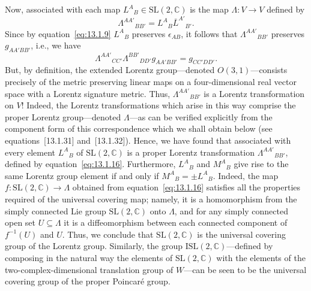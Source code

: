 Now, associated with each map \(L^A{}_B\in\mathrm{SL}(2,\mathbb C)\) is the map
\(\Lambda:V\longrightarrow V\) defined by
\begin{equation}
  \Lambda^{AA'}{}_{BB'}=L^A{}_B\overline L^{A'}{}_{B'}.
  \tag{13.1.16}\label{eq:13.1.16}
\end{equation}
Since by equation~\eqref{eq:13.1.9} \(L^A{}_B\) preserves
\(\epsilon_{AB}\), it follows that \(\Lambda^{AA'}{}_{BB'}\) preserves
\(g_{AA'BB'}\), i.e., we have
\begin{equation}
  \Lambda^{AA'}{}_{CC'}\Lambda^{BB'}{}_{DD'}g_{AA'BB'}
  =g_{CC'DD'}.
  \tag{13.1.17}\label{eq:13.1.17}
\end{equation}
But, by definition, the extended Lorentz group---denoted \(O(3,1)\)---consists
precisely of the metric preserving linear maps on a four-dimensional real vector
space with a Lorentz signature metric. Thus, \(\Lambda^{AA'}{}_{BB'}\) is a Lorentz
transformation on \(V\)! Indeed, the Lorentz transformations which arise in this way
comprise the proper Lorentz group---denoted \(\Lambda\)---as can be verified
explicitly from the component form of this correspondence which we shall obtain below
(see equations~[13.1.31] and~[13.1.32]). Hence, we have found that associated with
every element \(L^A{}_B\) of \(\mathrm{SL}(2,\mathbb C)\) is a proper Lorentz
transformation \(\Lambda^{AA'}{}_{BB'}\), defined by equation~\eqref{eq:13.1.16}.
Furthermore, \(L^A{}_B\) and \(M^A{}_B\) give rise to the same Lorentz group element
if and only if \(M^A{}_B=\pm L^A{}_B\). Indeed, the map
\(f:\mathrm{SL}(2,\mathbb C)\longrightarrow\Lambda\) obtained from
equation~\eqref{eq:13.1.16} satisfies all the properties required of the universal
covering map; namely, it is a homomorphism from the simply connected Lie group
\(\mathrm{SL}(2,\mathbb C)\) onto \(\Lambda\), and for any simply connected open set
\(U\subseteq\Lambda\) it is a diffeomorphism between each connected component of
\(f^{-1}(U)\) and \(U\). Thus, we conclude that \(\mathrm{SL}(2,\mathbb C)\) is the
universal covering group of the Lorentz group. Similarly, the group
\(\mathrm{ISL}(2,\mathbb C)\)---defined by composing in the natural way the elements
of \(\mathrm{SL}(2,\mathbb C)\) with the elements of the two-complex-dimensional
translation group of \(W\)---can be seen to be the universal covering group of the
proper Poincar\'e group.


